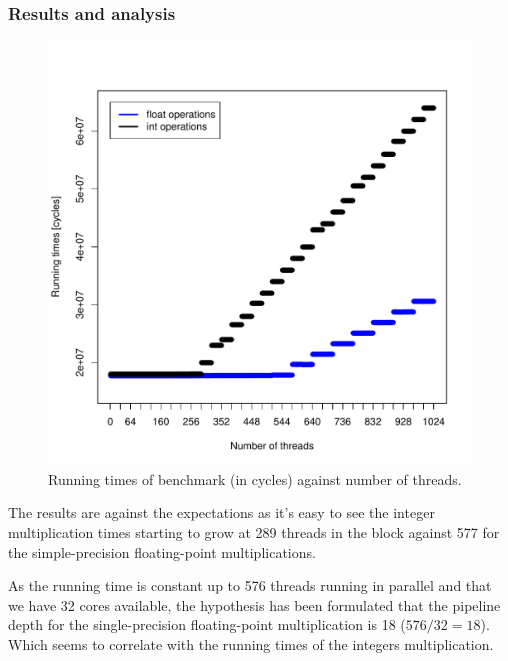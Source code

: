 \documentclass{report}
\def \scalingfactor{.8}
\begin{document}
	\subsubsection{Results and analysis}
    \begin{figure}[H]
    	\centering
		\vspace{-20pt}
	    \includegraphics[width=\scalingfactor\linewidth]{"graphics/float_vs_int_running_times"}
		\vspace{-15pt}
		\captionsetup{justification=centering}
        \caption{Running times of benchmark (in cycles) against number of threads.}
    \end{figure}
	
    The results are against the expectations as it's easy to see the integer
    multiplication times starting to grow at 289 threads in the block against
    577 for the simple-precision floating-point multiplications.
    
    As the running time is constant up to 576 threads running in parallel and that we have 32 cores
    available, the hypothesis has been formulated that the pipeline depth for the single-precision 
    floating-point multiplication is 18 ($576/32 = 18$). Which seems to correlate with the running
    times of the integers multiplication. 
    
\end{document}
